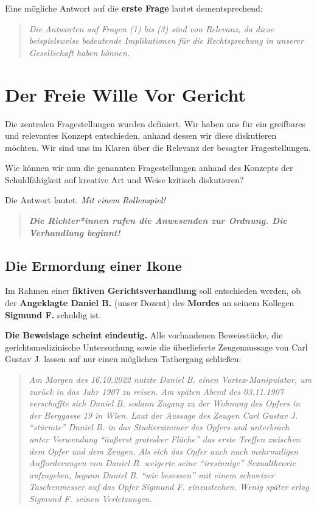 \documentclass[
  a4paper,
]{report}
\begin{document}
Eine mögliche Antwort auf die \textbf{erste Frage} lautet dementsprechend:

\begin{quote}
\emph{Die Antworten auf Fragen (1) bis (3) sind von Relevanz, da diese beispielsweise bedeutende Implikationen für die Rechtsprechung in unserer Gesellschaft haben können.}
\end{quote}

\hypertarget{der-freie-wille-vor-gericht}{%
\chapter{Der Freie Wille Vor Gericht}\label{der-freie-wille-vor-gericht}}

Die zentralen Fragestellungen wurden definiert. Wir haben uns für ein greifbares und relevantes Konzept entschieden, anhand dessen wir diese diskutieren möchten. Wir sind uns im Klaren über die Relevanz der besagter Fragestellungen.

Wie können wir nun die genannten Fragestellungen anhand des Konzepts der Schuldfähigkeit auf kreative Art und Weise kritisch diskutieren?

Die Antwort lautet. \emph{Mit einem Rollenspiel!}

\begin{quote}
\textbf{\emph{Die Richter*innen rufen die Anwesenden zur Ordnung. Die Verhandlung beginnt!}}
\end{quote}

\hypertarget{die-ermordung-einer-ikone}{%
\section{Die Ermordung einer Ikone}\label{die-ermordung-einer-ikone}}

Im Rahmen einer \textbf{fiktiven Gerichtsverhandlung} soll entschieden werden, ob der \textbf{Angeklagte Daniel B.} (unser Dozent) des \textbf{Mordes} an seinem Kollegen \textbf{Sigmund F.} schuldig ist.

\textbf{Die Beweislage scheint eindeutig.} Alle vorhandenen Beweisstücke, die gerichtsmedizinische Untersuchung sowie die überlieferte Zeugenaussage von Carl Gustav J. lassen auf nur einen möglichen Tathergang schließen:

\begin{quote}
\emph{Am Morgen des 16.10.2022 nutzte Daniel B. einen Vortex-Manipulator, um zurück in das Jahr 1907 zu reisen. Am späten Abend des 03.11.1907 verschaffte sich Daniel B. sodann Zugang zu der Wohnung des Opfers in der Berggasse 19 in Wien. Laut der Aussage des Zeugen Carl Gustav J. ``stürmte'' Daniel B. in das Studierzimmer des Opfers und unterbrach unter Verwendung ``äußerst grotesker Flüche'' das erste Treffen zwischen dem Opfer und dem Zeugen. Als sich das Opfer auch nach mehrmaligen Aufforderungen von Daniel B. weigerte seine ``irrsinnige'' Sexualtheorie aufzugeben, begann Daniel B. ``wie besessen'' mit einem schweizer Taschenmesser auf das Opfer Sigmund F. einzustechen. Wenig später erlag Sigmund F. seinen Verletzungen.}
\end{quote}
\end{document}
